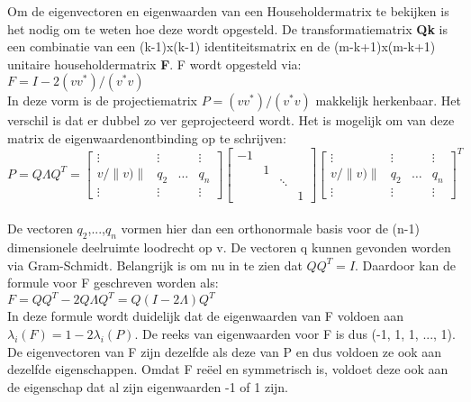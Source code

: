 Om de eigenvectoren en eigenwaarden van een Householdermatrix te bekijken is het nodig om te weten hoe deze wordt opgesteld. De transformatiematrix \textbf{Qk} is een combinatie van een (k-1)x(k-1) identiteitsmatrix en de (m-k+1)x(m-k+1) unitaire householdermatrix \textbf{F}. F wordt opgesteld  via:\\

$F = I -2(vv^{*})/(v^{*}v)$\\

In deze vorm is de projectiematrix $P = (vv^{*})/(v^{*}v)$ makkelijk herkenbaar. Het verschil is dat er dubbel zo ver geprojecteerd wordt. Het is mogelijk om van deze matrix de eigenwaardenontbinding op te schrijven:\\

\[
P = Q \Lambda Q^{T} = 
\begin{bmatrix}
    \vdots      & \vdots &  & \vdots\\
    v/\|v)\| & q_{2} & \dots & q_{n}\\
   \vdots      & \vdots &  & \vdots
\end{bmatrix}
\begin{bmatrix}
    -1\\
      & 1\\
      &   &  \ddots\\
	& & & 1
\end{bmatrix}
\begin{bmatrix}
    \vdots      & \vdots &  & \vdots\\
    v/\|v)\| & q_{2} & \dots & q_{n}\\
   \vdots      & \vdots &  & \vdots
\end{bmatrix}^{T}
\]\\

De vectoren $q_{2}$,...,$q_{n}$ vormen hier dan een orthonormale basis voor de (n-1) dimensionele deelruimte loodrecht op v. De vectoren q kunnen gevonden worden via Gram-Schmidt. Belangrijk is om nu in te zien dat $QQ^{T} = I$. Daardoor kan de formule voor F geschreven worden als:\\

$F = QQ^{T} - 2Q \Lambda Q^{T} = Q(I - 2\Lambda)Q^{T}$\\

In deze formule wordt duidelijk dat de eigenwaarden van F voldoen aan $\lambda_{i}(F) = 1-2\lambda_{i}(P)$. De reeks van eigenwaarden voor F is dus (-1, 1, 1, ..., 1). De eigenvectoren van F zijn dezelfde als deze van P en dus voldoen ze ook aan dezelfde eigenschappen. Omdat F reëel en symmetrisch is, voldoet deze ook aan de eigenschap dat al zijn eigenwaarden -1 of 1 zijn.

